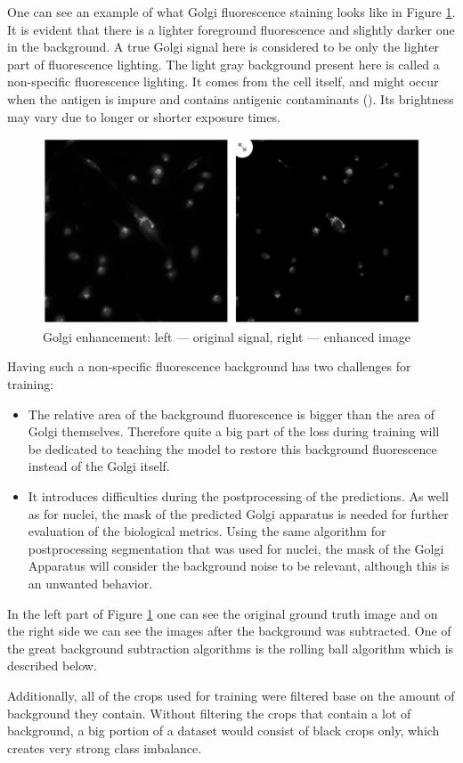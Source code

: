 One can see an example of what Golgi fluorescence staining looks like in Figure \ref{fig:golgi-enhancement}. It is evident that there is a lighter foreground fluorescence and slightly darker one in the background. A true Golgi signal here is considered to be only the lighter part of fluorescence lighting. The light gray background present here is called a non-specific fluorescence lighting. It comes from the cell itself, and might occur when the antigen is impure and contains antigenic contaminants (\cite{Borek_1984}). Its brightness may vary due to longer or shorter exposure times. 

\begin{figure}[htb]
	\begin{center}
		\includegraphics[width=0.5\linewidth]{bilder/enhancement.jpg}
		\caption{Golgi enhancement: left --- original signal, right --- enhanced image}\label{fig:golgi-enhancement}
	\end{center}
\end{figure}

Having such a non-specific fluorescence background has two challenges for training:
\begin{itemize}
    \item The relative area of the background fluorescence is bigger than the area of Golgi themselves. Therefore quite a big part of the loss during training will be dedicated to teaching the model to restore this background fluorescence instead of the Golgi itself.
    \item It introduces difficulties during the postprocessing of the predictions. As well as for nuclei, the mask of the predicted Golgi apparatus is needed for further evaluation of the biological metrics. Using the same algorithm for postprocessing segmentation that was used for nuclei, the mask of the Golgi Apparatus will consider the background noise to be relevant, although this is an unwanted behavior.
\end{itemize}

In the left part of Figure \ref{fig:golgi-enhancement} one can see the original ground truth image and on the right side we can see the images after the background was subtracted. One of the great background subtraction algorithms is the rolling ball algorithm which is described below.

Additionally, all of the crops used for training were filtered base on the amount of background they contain. Without filtering the crops that contain a lot of background, a big portion of a dataset would consist of black crops only, which creates very strong class imbalance.

